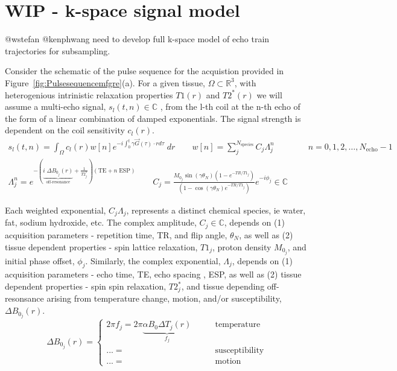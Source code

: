 \documentclass{article}         %
\theoremstyle{definition}
\theoremstyle{remark}
\begin{document}
\section{WIP - k-space signal model}


{\color{red} @wstefan @kenphwang need to develop full k-space model of echo train trajectories for subsampling.}

Consider the schematic of the pulse sequence for the  acquistion provided in
Figure~\ref{fig:Pulsesequencemfgre}(a).
For a  given tissue, $\Omega \subset \mathbb{R}^3$,
with heterogenious intrinistic relaxation properties $T1(r)$ and $T2^*(r)$
we will assume a multi-echo signal, $s_l(t,n)\in\mathbb{C}$ ,
from the l-th coil at the n-th echo 
of the form of a linear combination of damped exponentials. 
The signal strength is dependent on the coil sensitivity $c_l(r)$.
\begin{equation}
\label{multiechosignalmodel}
\begin{split}
 s_l(t,n) = \int_\Omega c_l(r)  w[n] e^{-i \int_0^t \gamma \vec{G}(\tau)\cdot r d \tau} \; dr
\qquad
 w[n]  = \sum_j^{N_\text{species}} 
 C_j \Lambda_j^n 
  \qquad  \qquad n = 0,1,2,\dots,N_\text{echo}-1
\\
\Lambda_j^n  = e^{-\left( 
\underbrace{i\; \Delta B_{0_j}(r) }_\text{off-resonance} 
+
\frac{1}{T2^*_j} \right) \left( \text{TE} + n \; \text{ESP}\right) } 
\quad  \quad
C_j = \frac{M_{0_j} \sin \left(\gamma \theta_N \right)\left( 1- e^{-TR/T1_j}\right)}{\left( 1- \cos \left(\gamma \theta_N \right) e^{-TR/T1_j}\right)}
e^{-i  \phi_j} 
\in  \mathbb{C} 
\end{split}
\end{equation}

Each weighted exponential, $C_j \Lambda_j$, represents a distinct chemical species,
ie water, fat, sodium hydroxide, etc. 
The complex amplitude,
$C_j \in \mathbb{C}$, 
depends on (1) acquisition parameters - repetition time, TR,
and flip angle, $\theta_N$, as well as (2) tissue dependent properties -
 spin lattice relaxation,  $T1_j$,
 proton density $M_{0_j}$, and
 initial phase offset, $\phi_j$.
Similarly, the complex exponential, $\Lambda_j$,
depends on (1) acquisition parameters - echo time, TE,
echo spacing , ESP, as well as (2) tissue dependent properties -
 spin spin relaxation,  $T2^*_j$, and tissue depending off-resonsance
arising from temperature change, motion, and/or susceptibility, 
$\Delta B_{0_j}(r)$.
\[
 \Delta B_{0_j}(r) = 
\left\{ 
\begin{split}
                2\pi f_j = 2\pi \underbrace{\alpha B_0 \Delta T_j(r)}_{f_j} & \qquad \text{temperature}   
\\
                ... =      & \qquad \text{susceptibility}   
\\
                ... =      & \qquad \text{motion}   
\end{split}
\right.
\]
\end{document}
